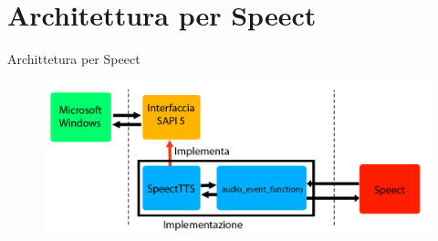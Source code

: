\documentclass{beamer}
\begin{document}
	\section{Architettura per Speect}
	
	\begin{frame}{Archittetura per Speect}
		\begin{figure}[H]
			\centering
			\includegraphics[width=\textwidth]{images/SpeectTTS-sapi5.png}
		\end{figure}
	\end{frame}
	

	
\end{document}
